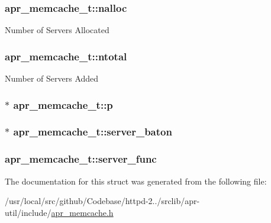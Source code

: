\subsubsection[{\texorpdfstring{nalloc}{nalloc}}]{ apr\+\_\+memcache\+\_\+t\+::nalloc}\hypertarget{structapr__memcache__t_a95d15cfa5b291700cd9a697687eeac73}{}\label{structapr__memcache__t_a95d15cfa5b291700cd9a697687eeac73}
Number of Servers Allocated 
\subsubsection[{\texorpdfstring{ntotal}{ntotal}}]{ apr\+\_\+memcache\+\_\+t\+::ntotal}\hypertarget{structapr__memcache__t_a94e1353d23d4d02a18a9f0ca0e90005d}{}\label{structapr__memcache__t_a94e1353d23d4d02a18a9f0ca0e90005d}
Number of Servers Added 
\subsubsection[{\texorpdfstring{p}{p}}]{$\ast$ apr\+\_\+memcache\+\_\+t\+::p}\hypertarget{structapr__memcache__t_a5157d1b71f12ecbdf8439eca46525c87}{}\label{structapr__memcache__t_a5157d1b71f12ecbdf8439eca46525c87}
\subsubsection[{\texorpdfstring{server\+\_\+baton}{server_baton}}]{$\ast$ apr\+\_\+memcache\+\_\+t\+::server\+\_\+baton}\hypertarget{structapr__memcache__t_aea9d227dec27ab31af244d5759c3939a}{}\label{structapr__memcache__t_aea9d227dec27ab31af244d5759c3939a}
\subsubsection[{\texorpdfstring{server\+\_\+func}{server_func}}]{ apr\+\_\+memcache\+\_\+t\+::server\+\_\+func}\hypertarget{structapr__memcache__t_a010fc90cc07583737ab09f958d182b8d}{}\label{structapr__memcache__t_a010fc90cc07583737ab09f958d182b8d}


The documentation for this struct was generated from the following file\+:\begin{DoxyCompactItemize}
\item 
/usr/local/src/github/\+Codebase/httpd-\/2../srclib/apr-\/util/include/\hyperlink{apr__memcache_8h}{apr\+\_\+memcache.\+h}\end{DoxyCompactItemize}
